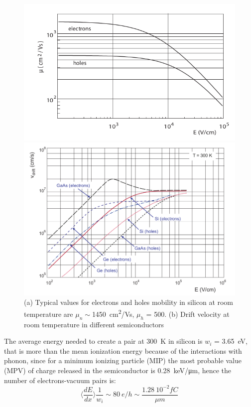     \begin{figure}[h!]
        \centering
        \includegraphics[width=.49\linewidth]{figures/Pixel_detectors/mobility_in_semiconductor.png}
        \caption{}
        \includegraphics[width=.49\linewidth]{figures/Pixel_detectors/velocity_in_semiconductor.png}
        \caption{(a) Typical values for electrons and holes mobility 
        in silicon at room temperature are $\mu _n \sim$\SI{1450}{cm\squared/Vs}, $\mu _h$ = 500. (b) Drift velocity at room temperature in different semiconductors}
        \label{fig:mobility_drift}
    \end{figure}

    The average energy needed to create a pair at \SI{300}{K} in silicon is $w_i$ = \SI{3.65}{eV}, that is more than the mean ionization energy because of the interactions with phonon, since for a minimum ionizing particle (MIP) the most probable value (MPV) of charge released in the semiconductor is \SI{0.28}{keV/\um}, hence the number of electrons-vacuum pairs is: 
    \begin{equation}
        \langle \frac{dE}{dx}\rangle \frac{1}{w_i} \sim 80 \: e/h \sim \frac{1.28 \:10^{-2}fC}{\mu m}
    \end{equation}

